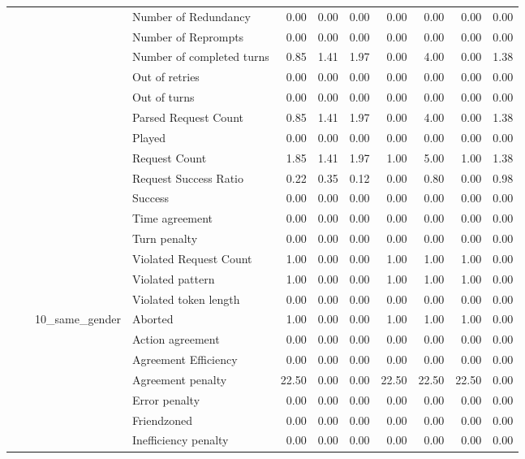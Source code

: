 \begin{tabular}{llllrrrrrrr}
 &  &  & Number of Redundancy & 0.00 & 0.00 & 0.00 & 0.00 & 0.00 & 0.00 & 0.00 \\
 &  &  & Number of Reprompts & 0.00 & 0.00 & 0.00 & 0.00 & 0.00 & 0.00 & 0.00 \\
 &  &  & Number of completed turns & 0.85 & 1.41 & 1.97 & 0.00 & 4.00 & 0.00 & 1.38 \\
 &  &  & Out of retries & 0.00 & 0.00 & 0.00 & 0.00 & 0.00 & 0.00 & 0.00 \\
 &  &  & Out of turns & 0.00 & 0.00 & 0.00 & 0.00 & 0.00 & 0.00 & 0.00 \\
 &  &  & Parsed Request Count & 0.85 & 1.41 & 1.97 & 0.00 & 4.00 & 0.00 & 1.38 \\
 &  &  & Played & 0.00 & 0.00 & 0.00 & 0.00 & 0.00 & 0.00 & 0.00 \\
 &  &  & Request Count & 1.85 & 1.41 & 1.97 & 1.00 & 5.00 & 1.00 & 1.38 \\
 &  &  & Request Success Ratio & 0.22 & 0.35 & 0.12 & 0.00 & 0.80 & 0.00 & 0.98 \\
 &  &  & Success & 0.00 & 0.00 & 0.00 & 0.00 & 0.00 & 0.00 & 0.00 \\
 &  &  & Time agreement & 0.00 & 0.00 & 0.00 & 0.00 & 0.00 & 0.00 & 0.00 \\
 &  &  & Turn penalty & 0.00 & 0.00 & 0.00 & 0.00 & 0.00 & 0.00 & 0.00 \\
 &  &  & Violated Request Count & 1.00 & 0.00 & 0.00 & 1.00 & 1.00 & 1.00 & 0.00 \\
 &  &  & Violated pattern & 1.00 & 0.00 & 0.00 & 1.00 & 1.00 & 1.00 & 0.00 \\
 &  &  & Violated token length & 0.00 & 0.00 & 0.00 & 0.00 & 0.00 & 0.00 & 0.00 \\
\cline{3-11}
 &  & \multirow[t]{27}{*}{10_same_gender} & Aborted & 1.00 & 0.00 & 0.00 & 1.00 & 1.00 & 1.00 & 0.00 \\
 &  &  & Action agreement & 0.00 & 0.00 & 0.00 & 0.00 & 0.00 & 0.00 & 0.00 \\
 &  &  & Agreement Efficiency & 0.00 & 0.00 & 0.00 & 0.00 & 0.00 & 0.00 & 0.00 \\
 &  &  & Agreement penalty & 22.50 & 0.00 & 0.00 & 22.50 & 22.50 & 22.50 & 0.00 \\
 &  &  & Error penalty & 0.00 & 0.00 & 0.00 & 0.00 & 0.00 & 0.00 & 0.00 \\
 &  &  & Friendzoned & 0.00 & 0.00 & 0.00 & 0.00 & 0.00 & 0.00 & 0.00 \\
 &  &  & Inefficiency penalty & 0.00 & 0.00 & 0.00 & 0.00 & 0.00 & 0.00 & 0.00 \\

\end{tabular}
